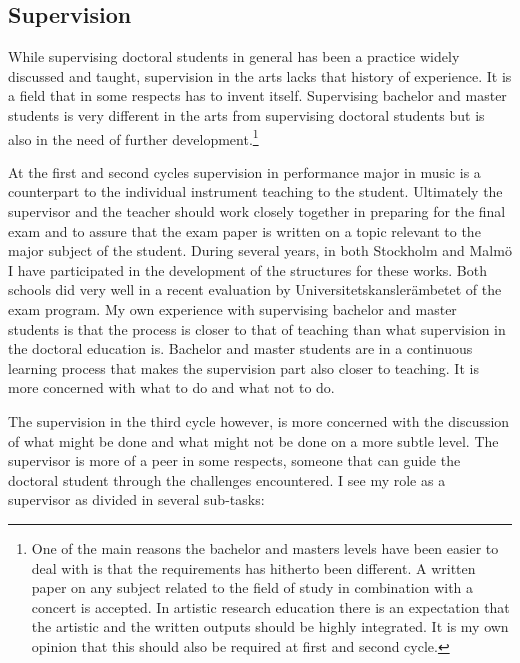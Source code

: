 \documentclass[a4paper]{article}
\begin{document}
\subsection*{\textsf{Supervision}}

While supervising doctoral students in general has been a practice widely discussed and taught, supervision in the arts lacks that history of experience. It is a field that in some respects has to invent itself. Supervising bachelor and master students is very different in the arts from supervising doctoral students but is also in the need of further development.\footnote{One of the main reasons the bachelor and masters levels have been easier to deal with is that the requirements has hitherto been different. A written paper on any subject related to the field of study in combination with a concert is accepted. In artistic research education there is an expectation that the artistic and the written outputs should be highly integrated. It is my own opinion that this should also be required at first and second cycle.}

At the first and second cycles supervision in performance major in music is a counterpart to the individual instrument teaching to the student. Ultimately the supervisor and the teacher should work closely together in preparing for the final exam and to assure that the exam paper is written on a topic relevant to the major subject of the student. During several years, in both Stockholm and Malmö I have participated in the development of the structures for these works. Both schools did very well in a recent evaluation by Universitetskanslerämbetet of the exam program. My own experience with supervising bachelor and master students is that the process is closer to that of teaching than what supervision in the doctoral education is. Bachelor and master students are in a continuous learning process that makes the supervision part also closer to teaching. It is more concerned with what to do and what not to do.

The supervision in the third cycle however, is more concerned with the discussion of what might be done and what might not be done on a more subtle level. The supervisor is more of a peer in some respects, someone that can guide the doctoral student through the challenges encountered. I see my role as a supervisor as divided in several sub-tasks:
\end{document}

